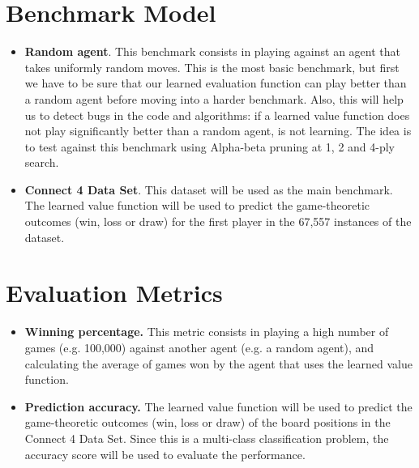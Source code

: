 \documentclass{article}
\begin{document}
\section{Benchmark Model}
\label{sec:benchmark}

\begin{itemize}

    \item \textbf{Random agent}. This benchmark consists in playing against an agent that takes
        uniformly random moves. This is the most basic benchmark, but first we have to be sure that
        our learned evaluation function can play better than a random agent before moving into a
        harder benchmark. Also, this will help us to detect bugs in the code and algorithms: if a
        learned value function does not play significantly better than a random agent, is not
        learning. The idea is to test against this benchmark using Alpha-beta pruning at 1, 2 and
        4-ply search.

    \item \textbf{Connect 4 Data Set}. This dataset will be used as the main benchmark. The learned
        value function will be used to predict the game-theoretic outcomes (win, loss or draw) for
        the first player in the 67,557 instances of the dataset.

\end{itemize}

\section{Evaluation Metrics}

\begin{itemize}

    \item \textbf{Winning percentage.} This metric consists in playing a high number of games (e.g.
        100,000) against another agent (e.g. a random agent), and calculating the average of games
        won by the agent that uses the learned value function.
        
    \item \textbf{Prediction accuracy.} The learned value function will be used to predict the
        game-theoretic outcomes (win, loss or draw) of the board positions in the Connect 4 Data
        Set. Since this is a multi-class classification problem, the accuracy score will be used to
        evaluate the performance.
        
\end{itemize}
\end{document}
